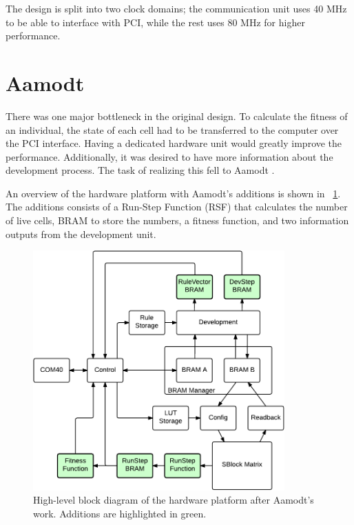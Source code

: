 The design is split into two clock domains; the communication unit uses 40 MHz to be able to interface with PCI, while the rest uses 80 MHz for higher performance.


\section{Aamodt}

There was one major bottleneck in the original design.
To calculate the fitness of an individual, the state of each cell had to be transferred to the computer over the PCI interface.
Having a dedicated hardware unit would greatly improve the performance.
Additionally, it was desired to have more information about the development process.
The task of realizing this fell to Aamodt \cite{aamodt2005sblock}.

An overview of the hardware platform with Aamodt's additions is shown in \figurename~\ref{fig:overview-aamodt}.
The additions consists of a Run-Step Function (RSF) that calculates the number of live cells, BRAM to store the numbers, a fitness function, and two information outputs from the development unit.

\begin{figure}[!ht]
    \centering
    \includegraphics[width=0.86\textwidth]{figures/overview-aamodt}
    \caption[Aamodt's hardware design]{
        High-level block diagram of the hardware platform after Aamodt's work.
        Additions are highlighted in green.
    }
    \label{fig:overview-aamodt}
\end{figure}

